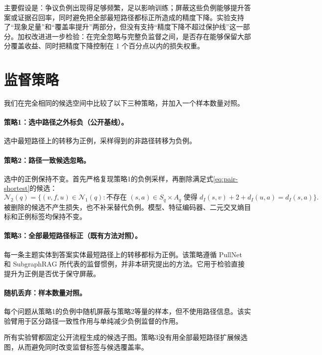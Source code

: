 \documentclass[UTF8,11pt]{ctexart}
\newcommand{\Norig}{\mathcal{N}_{1}}
\newcommand{\Npci}{\mathcal{N}_{2}}
\begin{document}
主要假设是：争议负例出现得足够频繁，足以影响训练；屏蔽这些负例能够提升答案或证据召回率，同时避免把全部最短路径都标正所造成的精度下降。实验支持了“现象足量”和“覆盖率提升”两部分，但没有支持“精度下降不超过保护线”这一部分。加权改进进一步检验：在完全忽略与完整负监督之间，是否存在能够保留大部分覆盖收益、同时把精度下降控制在 1 个百分点以内的损失权重。

\section{监督策略}

我们在完全相同的候选空间中比较了以下三种策略，并加入一个样本数量对照。

\paragraph{策略1：选中路径之外标负（公开基线）。}
选中最短路径上的转移为正例，采样得到的非路径转移为负例。

\paragraph{策略2：路径一致候选忽略。}
选中的正例保持不变。首先严格复现策略1的负例采样，再删除满足式\eqref{eq:pair-shortest}的候选：
\begin{equation}
 \Npci(q)=\{(v,f,u)\in\Norig(q):
 \text{不存在 }(s,a)\in S_q\times A_q\text{ 使得 }
 d_I(s,v)+2+d_I(u,a)=d_I(s,a)\}.
\end{equation}
被删除的候选不产生损失，也不补采替代负例。模型、特征编码器、二元交叉熵目标和正例标签均保持不变。

\paragraph{策略3：全部最短路径标正（既有方法对照）。}
每一条主题实体到答案实体最短路径上的转移都标为正例。该策略遵循 PullNet 和 SubgraphRAG 所代表的监督惯例，并非本研究提出的方法。它用于检验直接提升为正例是否优于保守屏蔽。

\paragraph{随机丢弃：样本数量对照。}
每个问题从策略1的负例中随机屏蔽与策略2等量的样本，但不使用路径信息。该实验臂用于区分路径一致性作用与单纯减少负例监督的作用。

所有实验臂都固定公开流程生成的候选子图。策略3没有用全部最短路径扩展候选图，从而避免同时改变监督标签与候选覆盖率。
\end{document}
